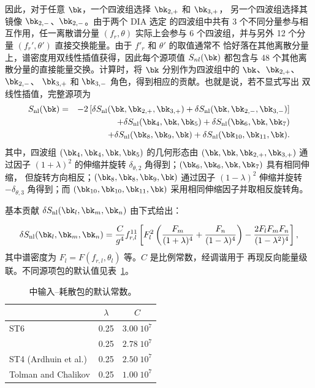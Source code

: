 因此，对于任意 $\bk$，一个四波组选择 $\bk_{2,+}$ 和 $\bk_{3,+}$，
另一个四波组选择其镜像 $\bk_{2,-}$、$\bk_{2,-}$。由于两个 DIA 选定
的四波组中共有 3 个不同分量参与相互作用，任一离散谱分量
$(f_r,\theta)$ 实际上会参与 6 个四波组，并与另外 12 个分量
$(f_r',\theta')$ 直接交换能量。由于 $f'_r$ 和 $\theta'$ 的取值通常不
恰好落在其他离散分量上，谱密度用双线性插值获得，因此每个源项值
$S_{nl}(\bk)$ 都包含与 48 个其他离散分量的直接能量交换。计算时，将
$\bk$ 分别作为四波组中的 $\bk$、$\bk_{2,+}$、$\bk_{2,-}$、
$\bk_{3,+}$ 和 $\bk_{3,-}$ 角色，得到相应的贡献。也就是说，若不显式写出
双线性插值，完整源项为
\begin{eqnarray} 
S_{\mathrm{nl}}(\bk) &=& -2  \left[\delta S_{\mathrm{nl}}(\bk,\bk_{2,+},\bk_{3,+})+\delta S_{\mathrm{nl}}(\bk,\bk_{2,-},\bk_{3,-})\right] \nonumber  \\
 & & + \delta  S_{\mathrm{nl}}(\bk_4,\bk,\bk_5) + \delta  S_{\mathrm{nl}}(\bk_6,\bk,\bk_7)  \\
     & &        +   \delta S_{\mathrm{nl}}(\bk_8,\bk_9,\bk) + \delta S_{\mathrm{nl}}(\bk_{10},\bk_{11},\bk) . \label{eq:diasum}
\end{eqnarray}
其中，四波组 $(\bk_4,\bk_4,\bk,\bk_5)$ 的几何形态由
$(\bk,\bk,\bk_{2,+},\bk_{3,+})$ 通过因子 $(1+\lambda)^2$ 的伸缩并旋转
$\delta_{\theta,2}$ 角得到；$(\bk_6,\bk_6,\bk,\bk_7)$ 具有相同伸缩，
但旋转方向相反；$(\bk_8,\bk_8,\bk_9,\bk)$ 通过因子 $(1-\lambda)^2$
伸缩并旋转 $-\delta_{\theta,3}$ 角得到；而
$(\bk_{10},\bk_{10},\bk_{11},\bk)$ 采用相同伸缩因子并取相反旋转角。


基本贡献 $\delta  S_{\mathrm{nl}}(\bk_l,\bk_m,\bk_n)$ 由下式给出：

\begin{equation}
\delta S_{\mathrm{nl}}(\bk_l,\bk_m,\bk_n) =  \frac{C}{g^4} f_{r,l}^{11} \left [ F_l^2 \left ( \frac{F_m}{(1+\lambda)^4} +
        \frac{F_n}{(1-\lambda)^4} \right ) - \frac{2 F_l F_m F_n}{(1-\lambda^2)^4} \right] ,
      \label{eq:snl_dia}
\end{equation}
其中谱密度为 $F_l = F(f_{r,l} ,\theta_l)$ 等。$C$ 是比例常数，经调谐用于
再现反向能量级联。不同源项包的默认值见表~\ref{tab:snl_par}。



\begin{table} \begin{center}
 \begin{tabular}{|l|c|c|} \hline
                    & $\lambda$ &     $C$      \\ \hline
ST6                 &      0.25      & $3.00 \; 10^7$  \\ \hline
\wam-3              &      0.25      & $2.78 \; 10^7$  \\ \hline
ST4 (Ardhuin et al.)&      0.25      & $2.50 \; 10^7$  \\ \hline
Tolman and Chalikov &      0.25      & $1.00 \; 10^7$  \\ \hline
\end{tabular} \end{center}
\caption{\dia\ 中输入--耗散包的默认常数。}
\label{tab:snl_par} \botline \end{table}

